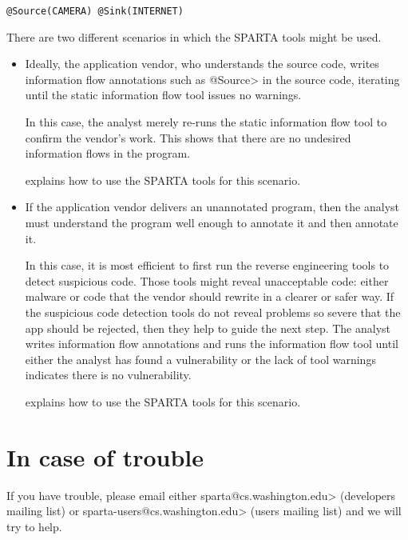 \begin{Verbatim}
@Source(CAMERA) @Sink(INTERNET)
\end{Verbatim}



There are two different scenarios in which the SPARTA tools might be used.

\begin{itemize}
\item
  Ideally, the application vendor, who understands the source code,
  writes information flow annotations such as \<@Source> in the source
  code, iterating until the static information flow tool issues no warnings.

  In this case, the analyst merely re-runs the static information flow tool
  to confirm the vendor's work.  This shows that there are no undesired
  information flows in the program.

   explains how to use the SPARTA tools for
  this scenario.

\item
  If the application vendor delivers an unannotated program, then the
  analyst must understand the program well enough to annotate it and then
  annotate it.

  In this case, it is most efficient to first run the reverse engineering
  tools to detect suspicious code.  Those tools might reveal unacceptable
  code: either malware or code that the vendor
  should rewrite in a clearer or safer way.  If the suspicious code
  detection tools do not reveal problems so severe that the app should be
  rejected, then they help to guide the next step.   The analyst writes
  information flow annotations and runs the information
  flow tool until either the analyst has found a vulnerability or the lack
  of tool warnings indicates there is no vulnerability.

   explains how to use the SPARTA tools for
  this scenario.
\end{itemize}


\section{In case of trouble\label{sec:incaseoftrouble}}

\begin{sloppypar}
If you have trouble, please email either
\<sparta@cs.washington.edu>
(developers mailing list) or
\<sparta-users@cs.washington.edu> (users
mailing list) and we will try to help.
\end{sloppypar}






